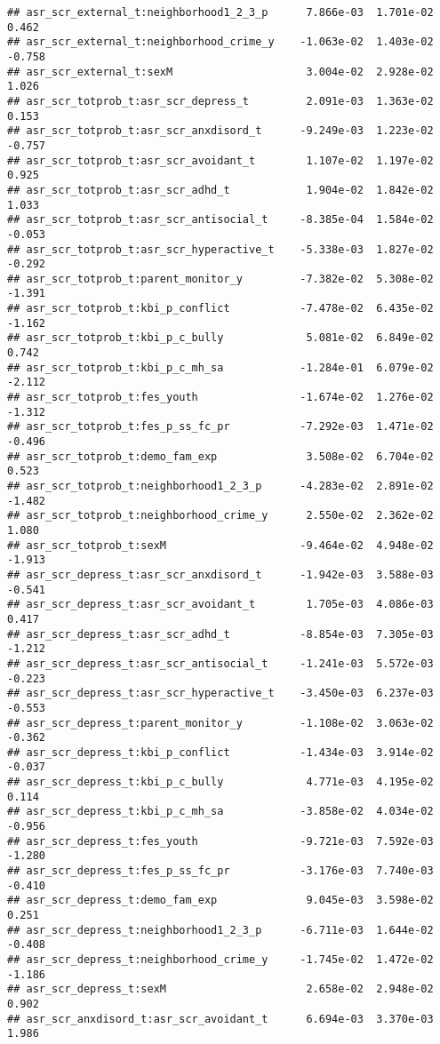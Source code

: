 \documentclass[
]{article}
\begin{document}
\begin{verbatim}
## asr_scr_external_t:neighborhood1_2_3_p      7.866e-03  1.701e-02   0.462
## asr_scr_external_t:neighborhood_crime_y    -1.063e-02  1.403e-02  -0.758
## asr_scr_external_t:sexM                     3.004e-02  2.928e-02   1.026
## asr_scr_totprob_t:asr_scr_depress_t         2.091e-03  1.363e-02   0.153
## asr_scr_totprob_t:asr_scr_anxdisord_t      -9.249e-03  1.223e-02  -0.757
## asr_scr_totprob_t:asr_scr_avoidant_t        1.107e-02  1.197e-02   0.925
## asr_scr_totprob_t:asr_scr_adhd_t            1.904e-02  1.842e-02   1.033
## asr_scr_totprob_t:asr_scr_antisocial_t     -8.385e-04  1.584e-02  -0.053
## asr_scr_totprob_t:asr_scr_hyperactive_t    -5.338e-03  1.827e-02  -0.292
## asr_scr_totprob_t:parent_monitor_y         -7.382e-02  5.308e-02  -1.391
## asr_scr_totprob_t:kbi_p_conflict           -7.478e-02  6.435e-02  -1.162
## asr_scr_totprob_t:kbi_p_c_bully             5.081e-02  6.849e-02   0.742
## asr_scr_totprob_t:kbi_p_c_mh_sa            -1.284e-01  6.079e-02  -2.112
## asr_scr_totprob_t:fes_youth                -1.674e-02  1.276e-02  -1.312
## asr_scr_totprob_t:fes_p_ss_fc_pr           -7.292e-03  1.471e-02  -0.496
## asr_scr_totprob_t:demo_fam_exp              3.508e-02  6.704e-02   0.523
## asr_scr_totprob_t:neighborhood1_2_3_p      -4.283e-02  2.891e-02  -1.482
## asr_scr_totprob_t:neighborhood_crime_y      2.550e-02  2.362e-02   1.080
## asr_scr_totprob_t:sexM                     -9.464e-02  4.948e-02  -1.913
## asr_scr_depress_t:asr_scr_anxdisord_t      -1.942e-03  3.588e-03  -0.541
## asr_scr_depress_t:asr_scr_avoidant_t        1.705e-03  4.086e-03   0.417
## asr_scr_depress_t:asr_scr_adhd_t           -8.854e-03  7.305e-03  -1.212
## asr_scr_depress_t:asr_scr_antisocial_t     -1.241e-03  5.572e-03  -0.223
## asr_scr_depress_t:asr_scr_hyperactive_t    -3.450e-03  6.237e-03  -0.553
## asr_scr_depress_t:parent_monitor_y         -1.108e-02  3.063e-02  -0.362
## asr_scr_depress_t:kbi_p_conflict           -1.434e-03  3.914e-02  -0.037
## asr_scr_depress_t:kbi_p_c_bully             4.771e-03  4.195e-02   0.114
## asr_scr_depress_t:kbi_p_c_mh_sa            -3.858e-02  4.034e-02  -0.956
## asr_scr_depress_t:fes_youth                -9.721e-03  7.592e-03  -1.280
## asr_scr_depress_t:fes_p_ss_fc_pr           -3.176e-03  7.740e-03  -0.410
## asr_scr_depress_t:demo_fam_exp              9.045e-03  3.598e-02   0.251
## asr_scr_depress_t:neighborhood1_2_3_p      -6.711e-03  1.644e-02  -0.408
## asr_scr_depress_t:neighborhood_crime_y     -1.745e-02  1.472e-02  -1.186
## asr_scr_depress_t:sexM                      2.658e-02  2.948e-02   0.902
## asr_scr_anxdisord_t:asr_scr_avoidant_t      6.694e-03  3.370e-03   1.986

\end{verbatim}
\end{document}

